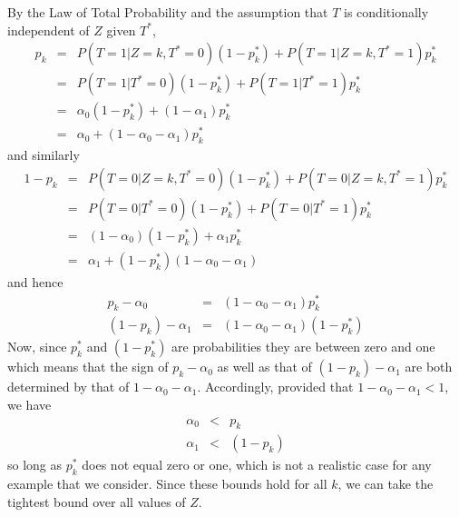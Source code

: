 \documentclass[12pt]{article}
\begin{document}
By the Law of Total Probability and the assumption that $T$ is conditionally independent of $Z$ given $T^*$,
\begin{eqnarray*}
  p_k &=& P(T=1|Z=k,T^*=0) (1 - p_k^*) + P(T=1|Z=k,T^*=1)p_k^*\\
  &=& P(T=1|T^*=0)(1 - p_k^*) + P(T=1|T^*=1)p_k^*\\
  &=& \alpha_0 (1 - p_k^*) + (1 - \alpha_1) p_k^*\\
  &=& \alpha_0 +(1 - \alpha_0 - \alpha_1) p_k^* 
\end{eqnarray*}
and similarly 
\begin{eqnarray*}
  1 - p_k &=& P(T=0|Z=k,T^*=0) (1 - p_k^*) + P(T=0|Z=k,T^*=1)p_k^*\\
  &=& P(T=0|T^*=0)(1 - p_k^*) + P(T=0|T^*=1)p_k^*\\
  &=& (1 - \alpha_0)(1 - p_k^*) + \alpha_1 p_k^*\\
  &=& \alpha_1 + (1 - p_k^*)(1 - \alpha_0 - \alpha_1)
\end{eqnarray*}
and hence
\begin{eqnarray*}
  p_k - \alpha_0 &=& (1 - \alpha_0 - \alpha_1)p_k^*\\
  (1 - p_k) - \alpha_1 &=& (1 - \alpha_0 - \alpha_1)(1 - p_k^*)
\end{eqnarray*}
Now, since $p_k^*$ and $(1 - p_k^*)$ are probabilities they are between zero and one which means that the sign of $p_k - \alpha_0$ as well as that of $(1 - p_k) - \alpha_1$ are both determined by that of $1 - \alpha_0 - \alpha_1$.
Accordingly, provided that $1 - \alpha_0 - \alpha_1 < 1$, we have
\begin{eqnarray*}
  \alpha_0 &<& p_k\\
  \alpha_1 &<& (1 - p_k)
\end{eqnarray*}
so long as $p_k^*$ does not equal zero or one, which is not a realistic case for any example that we consider.
Since these bounds hold for all $k$, we can take the tightest bound over all values of $Z$.

\end{document}
